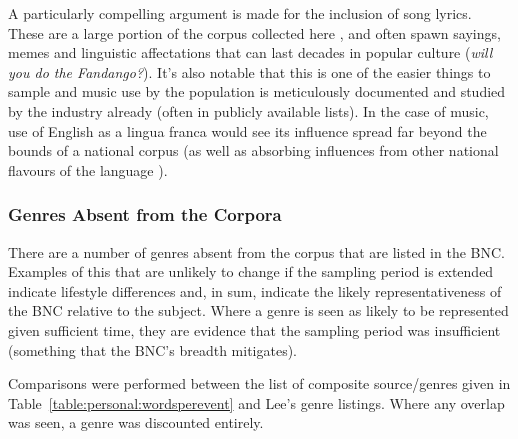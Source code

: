 A particularly compelling argument is made for the inclusion of song lyrics.  These are a large portion of the corpus collected here , and often spawn sayings, memes and linguistic affectations that can last decades in popular culture (\textit{will you do the Fandango?}).  It's also notable that this is one of the easier things to sample and music use by the population is meticulously documented and studied by the industry already (often in publicly available lists).  In the case of music, use of English as a lingua franca would see its influence spread far beyond the bounds of a national corpus (as well as absorbing influences from other national flavours of the language%
).









\subsubsection{Genres Absent from the Corpora}
There are a number of genres absent from the corpus that are listed in the BNC.  Examples of this that are unlikely to change if the sampling period is extended indicate lifestyle differences and, in sum, indicate the likely representativeness of the BNC relative to the subject.  Where a genre is seen as likely to be represented given sufficient time, they are evidence that the sampling period was insufficient (something that the BNC's breadth mitigates).

Comparisons were performed between the list of composite source/genres given in Table~\ref{table:personal:wordsperevent} and Lee's genre listings.  Where any overlap was seen, a genre was discounted entirely.


